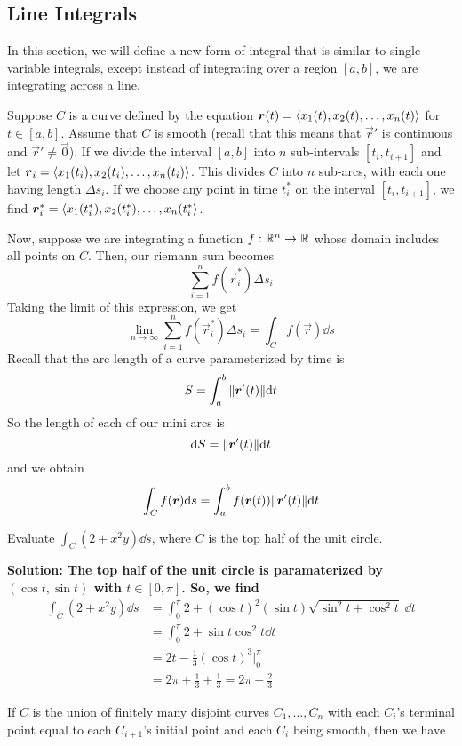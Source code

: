 \subsection{Line Integrals}
In this section, we will define a new form of integral that is similar to single variable integrals, except instead of integrating over a region $[a,b]$, we are integrating across a line. \par
Suppose $C$ is a curve defined by the equation $\boldsymbol{r}(t) = \left\langle x_1(t), x_2(t), \dots, x_n(t)\right\rangle$ for $t\in[a,b]$. Assume that $C$ is smooth (recall that this means that $\vec r'$ is continuous and $\vec r'\neq \vec 0$). If we divide the interval $[a,b]$ into $n$ sub-intervals $[t_i, t_{i+1}]$ and let $\boldsymbol{r}_i = \left\langle x_1(t_i), x_2(t_i), \dots, x_n(t_i)\right\rangle$. This divides $C$ into $n$ sub-arcs, with each one having length $\Delta s_i$. If we choose any point in time $t_i^*$ on the interval $[t_i, t_{i+1}]$, we find $\boldsymbol{r}_i^* = \left\langle x_1(t_i^*), x_2(t_i^*), \dots, x_n(t_i^*\right\rangle$. \par
Now, suppose we are integrating a function $f: \mathbb{R}^n\to \mathbb{R}$ whose domain includes all points on $C$. Then, our riemann sum becomes
\[ \sum_{i=1}^n f(\vec r_i^*)\Delta s_i\]
Taking the limit of this expression, we get
\[ \lim_{n\to\infty} \sum_{i=1}^n f(\vec r_i^*)\Delta s_i = \int_C f(\vec r)\dd s\]
Recall that the arc length of a curve parameterized by time is 
\[ S = \int_a^b \norm{\boldsymbol{r}'(t)}\dd t\]
So the length of each of our mini arcs is 
\[ \dd S = \norm{\boldsymbol{r}'(t)}\dd t \]
and we obtain
\[ \int_C f(\boldsymbol{r})\dd s = \int_a^b f(\boldsymbol{r}(t))\norm{\boldsymbol{r}'(t)}\dd t\]
\begin{example}
    Evaluate $\int_C (2+x^2y)\dd s$, where $C$ is the top half of the unit circle. \par
    \bf{Solution: }The top half of the unit circle is paramaterized by $(\cos t, \sin t)$ with $t\in[0, \pi]$. So, we find
    \begin{align*}
        \int_C (2+x^2y)\dd s &= \int_0^\pi 2+(\cos t)^2(\sin t)\sqrt{\sin^2t+\cos^2t}\;\dd t \\
        &= \int_0^\pi 2 + \sin t\cos^2t\dd t \\
        &= 2t - \frac{1}{3}(\cos t)^3 \biggr|_0^\pi \\
        &= 2\pi +\frac{1}{3} + \frac{1}{3} = \boxed{2\pi + \frac{2}{3}}
    \end{align*}
\end{example}
If $C$ is the union of finitely many disjoint curves $C_1, \dots, C_n$ with each $C_i$'s terminal point equal to each $C_{i+1}$'s initial point and each $C_i$ being smooth, then we have
